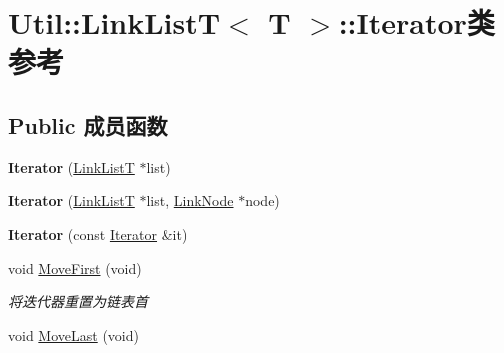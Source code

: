 \hypertarget{class_util_1_1_link_list_t_1_1_iterator}{\section{Util\-:\-:Link\-List\-T$<$ T $>$\-:\-:Iterator类 参考}
\label{class_util_1_1_link_list_t_1_1_iterator}
}
\subsection*{Public 成员函数}
\begin{DoxyCompactItemize}
\item 
\hypertarget{class_util_1_1_link_list_t_1_1_iterator_a6f172ac2f8e895787b0f9b50dc8e2b3a}{{\bfseries Iterator} (\hyperlink{class_util_1_1_link_list_t}{Link\-List\-T} $\ast$list)}\label{class_util_1_1_link_list_t_1_1_iterator_a6f172ac2f8e895787b0f9b50dc8e2b3a}

\item 
\hypertarget{class_util_1_1_link_list_t_1_1_iterator_a0da84afeafd99c0f0a07f07982becb68}{{\bfseries Iterator} (\hyperlink{class_util_1_1_link_list_t}{Link\-List\-T} $\ast$list, \hyperlink{class_util_1_1_link_list_t_1_1_link_node}{Link\-Node} $\ast$node)}\label{class_util_1_1_link_list_t_1_1_iterator_a0da84afeafd99c0f0a07f07982becb68}

\item 
\hypertarget{class_util_1_1_link_list_t_1_1_iterator_ad0e8fcdaeebf2741f48abf34dd9aa0e4}{{\bfseries Iterator} (const \hyperlink{class_util_1_1_link_list_t_1_1_iterator}{Iterator} \&it)}\label{class_util_1_1_link_list_t_1_1_iterator_ad0e8fcdaeebf2741f48abf34dd9aa0e4}

\item 
\hypertarget{class_util_1_1_link_list_t_1_1_iterator_a37319d14c5b70bf9d5387f7ce5dc8d58}{void \hyperlink{class_util_1_1_link_list_t_1_1_iterator_a37319d14c5b70bf9d5387f7ce5dc8d58}{Move\-First} (void)}\label{class_util_1_1_link_list_t_1_1_iterator_a37319d14c5b70bf9d5387f7ce5dc8d58}

\begin{DoxyCompactList}\small\item\em 将迭代器重置为链表首 \end{DoxyCompactList}\item 
\hypertarget{class_util_1_1_link_list_t_1_1_iterator_a445d1378a5f43e89f76d34698a8d6260}{void \hyperlink{class_util_1_1_link_list_t_1_1_iterator_a445d1378a5f43e89f76d34698a8d6260}{Move\-Last} (void)}\label{class_util_1_1_link_list_t_1_1_iterator_a445d1378a5f43e89f76d34698a8d6260}


\end{DoxyCompactItemize}
